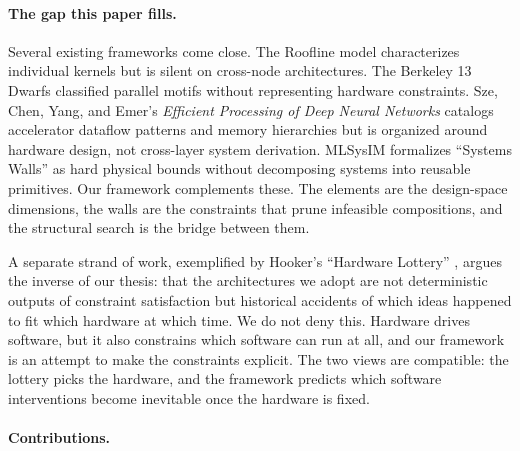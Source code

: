\documentclass[10pt,twocolumn]{article}
\begin{document}
\paragraph{The gap this paper fills.} Several existing frameworks come close. The Roofline model \citep{williams2009} characterizes individual kernels but is silent on cross-node architectures. The Berkeley 13 Dwarfs \citep{asanovic2006landscape} classified parallel motifs without representing hardware constraints. Sze, Chen, Yang, and Emer's \emph{Efficient Processing of Deep Neural Networks} \citep{sze2020} catalogs accelerator dataflow patterns and memory hierarchies but is organized around hardware design, not cross-layer system derivation. MLSysIM \citep{reddi2026mlsysim} formalizes ``Systems Walls'' as hard physical bounds without decomposing systems into reusable primitives. Our framework complements these. The elements are the design-space dimensions, the walls are the constraints that prune infeasible compositions, and the structural search is the bridge between them.

A separate strand of work, exemplified by Hooker's ``Hardware Lottery'' \citep{hooker2020hardware}, argues the inverse of our thesis: that the architectures we adopt are not deterministic outputs of constraint satisfaction but historical accidents of which ideas happened to fit which hardware at which time. We do not deny this. Hardware drives software, but it also constrains which software can run at all, and our framework is an attempt to make the constraints explicit. The two views are compatible: the lottery picks the hardware, and the framework predicts which software interventions become inevitable once the hardware is fixed.

\paragraph{Contributions.}
\end{document}
